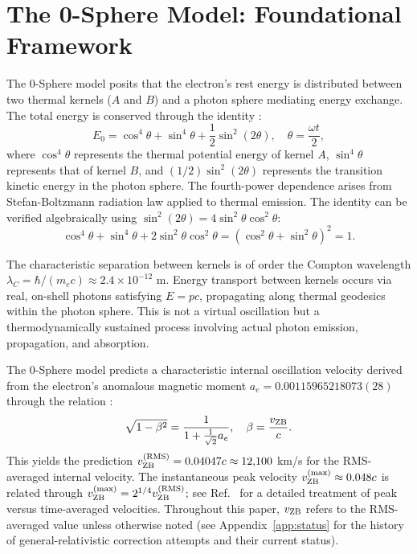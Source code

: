 \documentclass[%
 reprint,
 amsmath,amssymb,
 aps,
 prb,
]{revtex4-2}
\numberwithin{equation}{section}
\begin{document}
\section{The 0-Sphere Model: Foundational Framework}
\label{sec:0sphere_foundation}

The 0-Sphere model posits that the electron's rest energy is distributed between two thermal kernels ($A$ and $B$) and a photon sphere mediating energy exchange. The total energy is conserved through the identity \cite{Hanamura2024Spin,Hanamura2026Geometrical}:
\begin{equation}
E_0 = \cos^4\theta + \sin^4\theta + \frac{1}{2}\sin^2(2\theta), \quad \theta = \frac{\omega t}{2},
\label{eq:energy_identity}
\end{equation}
where $\cos^4\theta$ represents the thermal potential energy of kernel $A$, $\sin^4\theta$ represents that of kernel $B$, and $(1/2)\sin^2(2\theta)$ represents the transition kinetic energy in the photon sphere. The fourth-power dependence arises from Stefan-Boltzmann radiation law applied to thermal emission. The identity can be verified algebraically using $\sin^2(2\theta) = 4\sin^2\theta\cos^2\theta$:
\[
\cos^4\theta + \sin^4\theta + 2\sin^2\theta\cos^2\theta = (\cos^2\theta + \sin^2\theta)^2 = 1.
\]

The characteristic separation between kernels is of order the Compton wavelength $\lambda_C = \hbar/(m_e c) \approx 2.4 \times 10^{-12}$ m. Energy transport between kernels occurs via real, on-shell photons satisfying $E = pc$, propagating along thermal geodesics within the photon sphere. This is not a virtual oscillation but a thermodynamically sustained process involving actual photon emission, propagation, and absorption.

The 0-Sphere model predicts a characteristic internal oscillation velocity derived from the electron's anomalous magnetic moment $a_e = 0.00115965218073(28)$ through the relation \cite{Hanamura2024Spin}:
\begin{equation}
\sqrt{1 - \beta^2} = \frac{1}{1 + \frac{1}{\sqrt{2}}a_e}, \quad \beta = \frac{v_{\rm ZB}}{c}.
\label{eq:anomalous_relation}
\end{equation}
This yields the prediction $v_{\rm ZB}^{\rm (RMS)} = 0.04047c \approx 12{,}100$ km/s for the RMS-averaged internal velocity. The instantaneous peak velocity $v_{\rm ZB}^{\rm (max)} \approx 0.048c$ is related through $v_{\rm ZB}^{\rm (max)} = 2^{1/4} v_{\rm ZB}^{\rm (RMS)}$; see Ref.~\cite{Hanamura2026NonPert} for a detailed treatment of peak versus time-averaged velocities. Throughout this paper, $v_{\rm ZB}$ refers to the RMS-averaged value unless otherwise noted (see Appendix~\ref{app:status} for the history of general-relativistic correction attempts and their current status).
\end{document}
